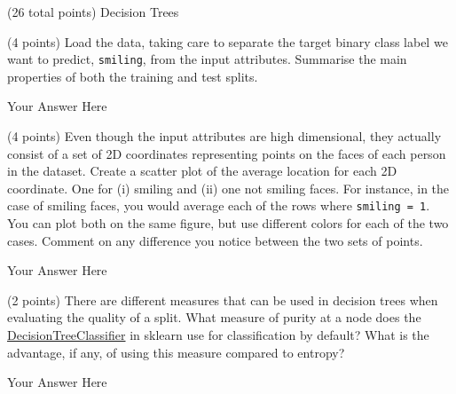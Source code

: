\documentclass[12pt]{article}
\begin{document}
\begin{question}{(26 total points) Decision Trees}





%
%
\begin{subquestion}{(4 points) Load the data, taking care to separate the target binary class label we want to predict, \texttt{smiling}, from the input attributes. 
Summarise the main properties of both the training and test splits. 
}


\begin{answerbox}{12em}
Your Answer Here
\end{answerbox}



\end{subquestion}


%
%
\begin{subquestion}{(4 points) Even though the input attributes are high dimensional, they actually consist of a set of 2D coordinates representing points on the faces of each person in the dataset. 
Create a scatter plot of the average location for each 2D coordinate. One for (i) smiling and (ii) one not smiling faces. 
For instance, in the case of smiling faces, you would average each of the rows where \texttt{smiling = 1}. 
You can plot both on the same figure, but use different colors for each of the two cases. 
Comment on any difference you notice between the two sets of points. \\
}


\begin{answerbox}{35em}
Your Answer Here
\end{answerbox}



\end{subquestion}


%
%
\begin{subquestion}{(2 points) 
There are different measures that can be used in decision trees when evaluating the quality of a split. 
What measure of purity at a node does the \href{https://scikit-learn.org/0.19/modules/generated/sklearn.tree.DecisionTreeClassifier.html}{DecisionTreeClassifier} in sklearn use for classification by default? 
What is the advantage, if any, of using this measure compared to entropy? 
}


\begin{answerbox}{10em}
Your Answer Here
\end{answerbox}




\end{subquestion}
\end{question}
\end{document}
